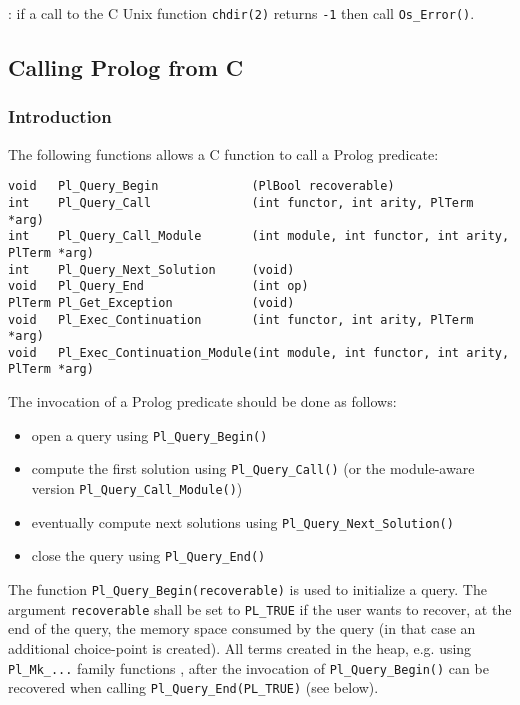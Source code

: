 : if a call to the C Unix function \texttt{chdir(2)} returns
\texttt{-1} then call \texttt{Os\_Error()}.


\subsection{Calling Prolog from C}

\subsubsection{Introduction}
The following functions allows a C function to call a Prolog predicate:

\begin{Indentation}
\begin{verbatim}
void   Pl_Query_Begin             (PlBool recoverable)
int    Pl_Query_Call              (int functor, int arity, PlTerm *arg)
int    Pl_Query_Call_Module       (int module, int functor, int arity, PlTerm *arg)
int    Pl_Query_Next_Solution     (void)
void   Pl_Query_End               (int op)
PlTerm Pl_Get_Exception           (void)
void   Pl_Exec_Continuation       (int functor, int arity, PlTerm *arg)
void   Pl_Exec_Continuation_Module(int module, int functor, int arity, PlTerm *arg)
\end{verbatim}
\end{Indentation}

The invocation of a Prolog predicate should be done as follows:

\begin{itemize}

\item open a query using \texttt{Pl\_Query\_Begin()}

\item compute the first solution using \texttt{Pl\_Query\_Call()} (or the
  module-aware version \texttt{Pl\_Query\_Call\_Module()})

\item eventually compute next solutions using
\texttt{Pl\_Query\_Next\_Solution()}

\item close the query using \texttt{Pl\_Query\_End()}

\end{itemize}

The function \texttt{Pl\_Query\_Begin(recoverable)} is used to initialize a
query. The argument \texttt{recoverable} shall be set to \texttt{PL\_TRUE} if
the user wants to recover, at the end of the query, the memory space consumed
by the query (in that case an additional choice-point is created). All terms
created in the heap, e.g. using \texttt{Pl\_Mk\_...}  family functions
, after the invocation of
\texttt{Pl\_Query\_Begin()} can be recovered when calling
\texttt{Pl\_Query\_End(PL\_TRUE)} (see below).

